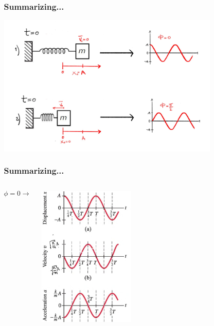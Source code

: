 \documentclass[]{beamer}
\begin{document}


\begin{frame}
\frametitle{Summarizing...}




  \begin{center}
  \includegraphics[height=2.8in]{images3/summarizing.jpg}
\end{center}


  \end{frame}



\begin{frame}
\frametitle{Summarizing...}




   \begin{columns}[c]
   \column{1.5in}  %

\begin{equation*}
\phi=0 \rightarrow
\end{equation*}

   \column{2.5in}

    \begin{center}
  \includegraphics[height=2.8in]{images3/xva.jpg}
\end{center}


   \end{columns}




  \end{frame}
\end{document}
